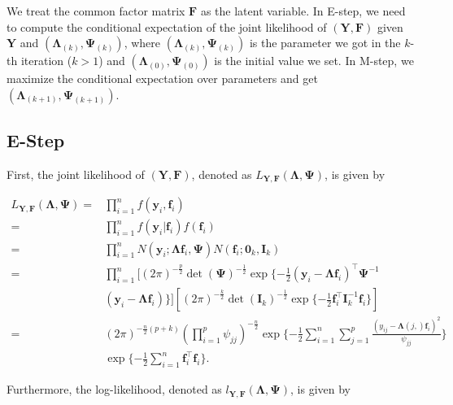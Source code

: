 \documentclass[
  a4paper,
  oneside,
  openany,
  12pt,
  onecolumn]{book}
\theoremstyle{plain}
\theoremstyle{remark}
\begin{document}
We treat the common factor matrix \(\boldsymbol{F}\) as the latent
variable. In E-step, we need to compute the conditional expectation of
the joint likelihood of \((\boldsymbol{Y},\boldsymbol{F})\) given
\(\boldsymbol{Y}\) and
\((\boldsymbol{\Lambda}_{(k)},\boldsymbol{\Psi}_{(k)})\), where
\((\boldsymbol{\Lambda}_{(k)},\boldsymbol{\Psi}_{(k)})\) is the
parameter we got in the \(k\)-th iteration (\(k>1\)) and
\((\boldsymbol{\Lambda}_{(0)},\boldsymbol{\Psi}_{(0)})\) is the initial
value we set. In M-step, we maximize the conditional expectation over
parameters and get
\((\boldsymbol{\Lambda}_{(k+1)},\boldsymbol{\Psi}_{(k+1)})\).

\subsection{E-Step}\label{e-step}

First, the joint likelihood of \((\boldsymbol{Y},\boldsymbol{F})\),
denoted as
\(L_{\boldsymbol{Y},\boldsymbol{F}}(\boldsymbol{\Lambda},\boldsymbol{\Psi})\),
is given by

\[
\begin{align*}
L_{\boldsymbol{Y},\boldsymbol{F}}(\boldsymbol{\Lambda},\boldsymbol{\Psi})=&\prod_{i=1}^nf(\boldsymbol{y}_i,\boldsymbol{f}_i)\\
=&\prod_{i=1}^nf(\boldsymbol{y}_i|\boldsymbol{f}_i)f(\boldsymbol{f}_i)\\
=&\prod_{i=1}^nN(\boldsymbol{y}_i;\boldsymbol{\Lambda}\boldsymbol{f}_i,\boldsymbol{\Psi})N(\boldsymbol{f}_i;\boldsymbol{0}_k,\boldsymbol{I}_k)\\
=&\prod_{i=1}^n[(2\pi)^{-\frac{p}{2}}\det(\boldsymbol{\Psi})^{-\frac{1}{2}}\exp\{-\frac{1}{2}(\boldsymbol{y}_i-\boldsymbol{\Lambda}\boldsymbol{f}_i)^\top\boldsymbol{\Psi}^{-1}\\
&(\boldsymbol{y}_i-\boldsymbol{\Lambda}\boldsymbol{f}_i)\}][(2\pi)^{-\frac{k}{2}}\det({\boldsymbol{I}_k})^{-\frac{1}{2}}\exp\{-\frac{1}{2}\boldsymbol{f}_i^\top\boldsymbol{I}_k^{-1}\boldsymbol{f}_i\}]\\
= &(2\pi)^{-\frac{n}{2}(p+k)}(\prod_{i=1}^p\psi_{jj})^{-\frac{n}{2}}\exp\{-\frac{1}{2}\sum_{i=1}^n\sum_{j=1}^p\frac{(y_{ij}-\boldsymbol{\Lambda}(j,)\boldsymbol{f}_i)^2}{\psi_{jj}}\}\\
&\exp\{-\frac{1}{2}\sum_{i=1}^n\boldsymbol{f}_i^\top\boldsymbol{f}_i\}.
\end{align*}
\]

Furthermore, the log-likelihood, denoted as
\(l_{\boldsymbol{Y},\boldsymbol{F}}(\boldsymbol{\Lambda},\boldsymbol{\Psi})\),
is given by
\end{document}
